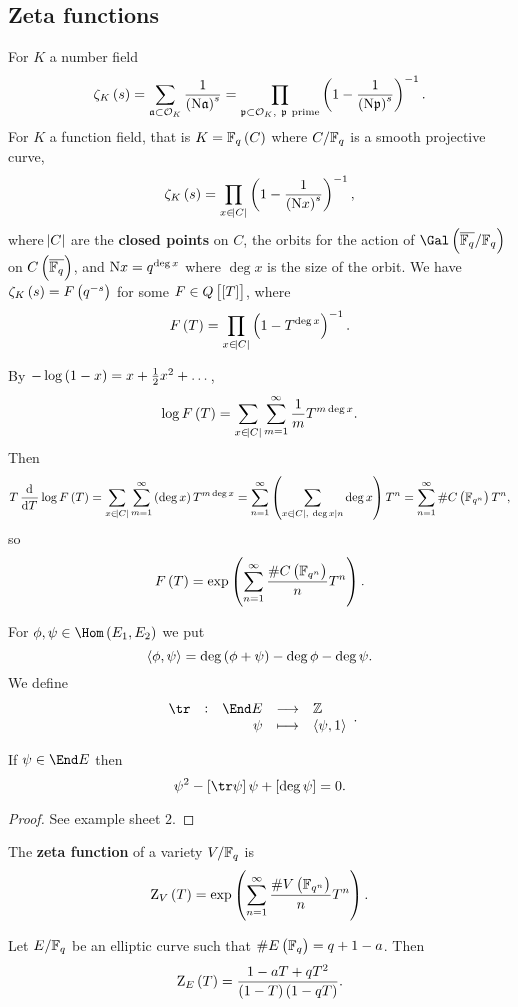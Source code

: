 \subsection{Zeta functions}

For $ K $ a number field
$$ \zeta_K\br{s} = \sum_{\aaa \subset \OOO_K} \dfrac{1}{\br{\N\aaa}^s} = \prod_{\ppp \subset \OOO_K, \ \ppp \ \text{prime}} \br{1 - \dfrac{1}{\br{\N\ppp}^s}}^{-1}. $$
For $ K $ a function field, that is $ K = \FF_q\br{C} $ where $ C / \mathbb{F}_q $ is a smooth projective curve,
$$ \zeta_K\br{s} = \prod_{x \in \abs{C}} \br{1 - \dfrac{1}{\br{\N x}^s}}^{-1}, $$
where $ \abs{C} $ are the \textbf{closed points} on $ C $, the orbits for the action of $ \Gal\br{\overline{\FF_q} / \FF_q} $ on $ C\br{\overline{\FF_q}} $, and $ \mathrm{N} x = q^{\deg x} $ where $ \deg x $ is the size of the orbit. We have $ \zeta_K\br{s} = F\br{q^{-s}} $ for some $ F \in Q\sbr{\sbr{T}} $, where
$$ F\br{T} = \prod_{x \in \abs{C}} \br{1 - T^{\deg x}}^{-1}. $$

\pagebreak

By $ -\log \br{1 - x} = x + \tfrac{1}{2}x^2 + \dots $,
$$ \log F\br{T} = \sum_{x \in \abs{C}} \sum_{m = 1}^\infty \dfrac{1}{m}T^{m\deg x}. $$
Then
$$ T\dod{}{T}\log F\br{T} = \sum_{x \in \abs{C}} \sum_{m = 1}^\infty \br{\deg x}T^{m\deg x} = \sum_{n = 1}^\infty \br{\sum_{x \in \abs{C}, \ \deg x \mid n} \deg x}T^n = \sum_{n = 1}^\infty \#C\br{\FF_{q^n}}T^n, $$
so
$$ F\br{T} = \exp \br{\sum_{n = 1}^\infty \dfrac{\#C\br{\FF_{q^n}}}{n}T^n}. $$


For $ \phi, \psi \in \Hom\br{E_1, E_2} $ we put
$$ \abr{\phi, \psi} = \deg \br{\phi + \psi} - \deg \phi - \deg \psi. $$
We define
$$ \function[\tr]{\End E}{\ZZ}{\psi}{\abr{\psi, 1}}. $$

\begin{lemma}
\label{lem:7.3}
If $ \psi \in \End E $ then
$$ \psi^2 - \sbr{\tr \psi}\psi + \sbr{\deg \psi} = 0. $$
\end{lemma}

\begin{proof}
See example sheet $ 2 $.
\end{proof}

\begin{definition*}
The \textbf{zeta function} of a variety $ V / \mathbb{F}_q $ is
$$ \Z_V\br{T} = \exp \br{\sum_{n = 1}^\infty \dfrac{\#V\br{\FF_{q^n}}}{n}T^n}. $$
\end{definition*}

\begin{lemma}
Let $ E / \mathbb{F}_q $ be an elliptic curve such that $ \#E\br{\FF_q} = q + 1 - a $. Then
$$ \Z_E\br{T} = \dfrac{1 - aT + qT^2}{\br{1 - T}\br{1 - qT}}. $$
\end{lemma}

